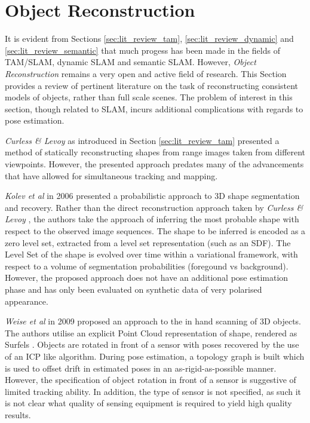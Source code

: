 {%
\section{Object Reconstruction}
\label{sec:lit_review_obj_recon}
It is evident from Sections \ref{sec:lit_review_tam}, \ref{sec:lit_review_dynamic} and 
\ref{sec:lit_review_semantic} that much progess has been made in the fields of TAM/SLAM, 
dynamic SLAM and semantic SLAM. However, \textit{Object Reconstruction} remains a very open 
and active field of research. This Section provides a review of pertinent literature on the 
task of reconstructing consistent models of objects, rather than full scale scenes. The problem of 
interest in this section, though related to SLAM, incurs additional complications with regards 
to pose estimation.

\textit{Curless \& Levoy} \cite{Curless1996} as introduced in Section \ref{sec:lit_review_tam} 
presented a method of statically reconstructing shapes from range images taken from different 
viewpoints. However, the presented approach predates many of the advancements that have allowed 
for simultaneous tracking and mapping.

\textit{Kolev et al} \cite{Kolev2006} in 2006 presented a probabilistic approach to 3D shape 
segmentation and recovery. Rather than the direct reconstruction approach taken by 
\textit{Curless \& Levoy} \cite{Curless1996}, the authors take the approach of inferring the most 
probable shape with respect to the observed image sequences. The shape to be inferred is encoded as a 
zero level set, extracted from a level set representation (such as an SDF). The Level Set of the shape is 
evolved over time within a variational framework, with respect to a volume of segmentation 
probabilities (foregound vs background). However, the proposed approach does not have an additional pose 
estimation phase and has only been evaluated on synthetic data of very polarised appearance.

\textit{Weise et al} \cite{Weise2009} in 2009 proposed an approach to the in hand scanning of 3D objects. 
The authors utilise an explicit Point Cloud representation of shape, rendered as Surfels \cite{Pfister2000}. 
Objects are rotated in front of a sensor with poses recovered by the use of an ICP like algorithm. During 
pose estimation, a topology graph is built which is used to offset drift in estimated poses in an 
as-rigid-as-possible \cite{Igarashi2005} manner. However, the specification of object rotation in front of 
a sensor is suggestive of limited tracking ability. In addition, the type of sensor is not specified, 
as such it is not clear what quality of sensing equipment is required to yield high quality results.

}
